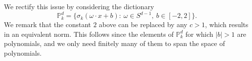 We rectify this issue by considering the dictionary
\begin{equation}
 \mathbb{P}^d_k = \{\sigma_k(\omega\cdot x + b):~\omega\in S^{d-1},~b\in [-2,2]\}.
\end{equation}
We remark that the constant $2$ above can be replaced by any $c > 1$, which results in an equivalent norm. This follows since the elements of $\mathbb{P}^d_k$ for which $|b| > 1$ are polynomials, and we only need finitely many of them to span the space of polynomials.

% 
% 
